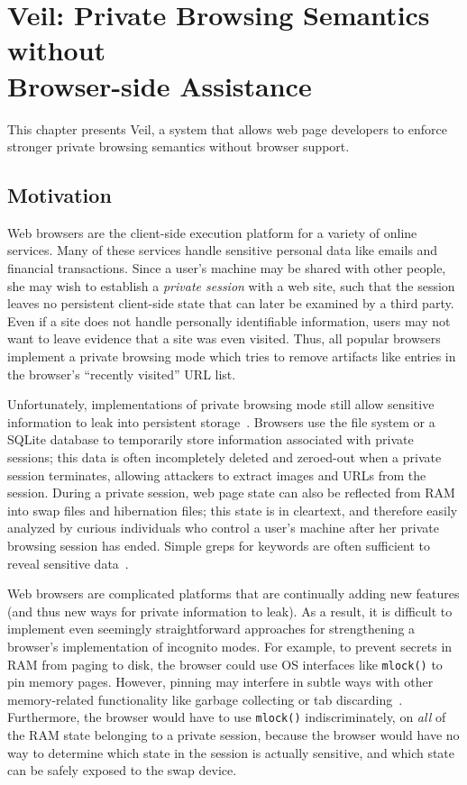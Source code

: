 \section[Veil: Private Browsing Semantics without Browser-side Assistance]{Veil: Private Browsing Semantics without \\ Browser-side Assistance}
\label{chap:veil}

This chapter presents Veil, a system that allows web page 
developers to enforce stronger private browsing semantics without
browser support.

\subsection{Motivation}
Web browsers are the client-side execution platform
for a variety of online services. Many of these
services handle sensitive personal data like emails
and financial transactions. Since a user's machine
may be shared with other people, she may wish to
establish a \emph{private session} with a web site,
such that the session leaves no persistent
client-side state that can later be examined by a
third party. Even if a site does not handle
personally identifiable information, users may
not want to leave evidence that a site was even
visited. Thus, all popular browsers implement a
private browsing mode which tries to remove
artifacts like entries in the browser's ``recently
visited'' URL list.

Unfortunately, implementations of private browsing
mode still allow sensitive information to leak into
persistent storage~\cite{aggarwal10,dt2016,magnetForensicsChrome,ohana13}.
Browsers use the file system or a SQLite database
to temporarily store information associated with private
sessions; this data is often incompletely deleted
and zeroed-out when a private session terminates,
allowing attackers to extract images and URLs from
the session. During a private session, web page
state can also be reflected from RAM into swap
files and hibernation files; this state is in cleartext,
and therefore easily analyzed by curious individuals
who control a user's machine after her private
browsing session has ended. Simple greps for
keywords are often sufficient to reveal sensitive
data~\cite{aggarwal10,dt2016}.

Web browsers are complicated platforms that are
continually adding new features (and thus new ways
for private information to leak). As a result, it is
difficult to implement even seemingly straightforward
approaches for strengthening a browser's implementation
of incognito modes. For example, to prevent secrets in
RAM from paging to disk, the browser could use OS
interfaces like \texttt{mlock()} to pin memory pages.
However, pinning may interfere in subtle ways with other
memory-related functionality like garbage collecting or
tab discarding~\cite{tabDiscarding}.
Furthermore, the browser would have to use \texttt{mlock()}
indiscriminately, on \textit{all} of the RAM state
belonging to a private session, because the browser would
have no way to determine which state in the session is
actually sensitive, and which state can be safely
exposed to the swap device.

